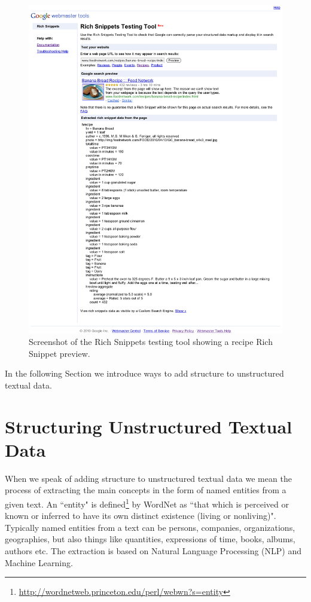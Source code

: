 \documentclass[12pt]{article}
\begin{document}
\begin{figure}[htbp!]
\begin{center}
  \includegraphics[width=1.0\linewidth]{./resources/rich-snippets-testing-tool.png}
    \caption{Screenshot of the Rich Snippets testing tool showing a recipe Rich Snippet preview.}
  \label{fig:rich-snippets-testing-tool}
  \end{center}  
\end{figure}

In the following Section we introduce ways to add structure to unstructured textual data.

\section{Structuring Unstructured Textual Data}
When we speak of adding structure to unstructured textual data we mean the process of extracting the main concepts in the form of named entities from a given text. An ``entity" is defined\footnote{\url{http://wordnetweb.princeton.edu/perl/webwn?s=entity}} by WordNet as ``that which is perceived or known or inferred to have its own distinct existence (living or nonliving)". Typically named entities from a text can be persons, companies, organizations, geographies, but also things like quantities, expressions of time, books, albums, authors etc. The extraction is based on Natural Language Processing (NLP) and Machine Learning.
\end{document}
